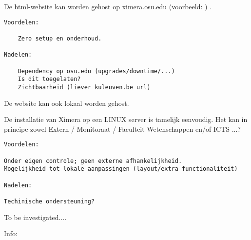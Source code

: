 \documentclass{ximera}
\begin{document}
De html-website kan worden gehost op ximera.osu.edu  (voorbeeld: ) . 

\begin{verbatim}
Voordelen:

    Zero setup en onderhoud.

Nadelen:

    Dependency op osu.edu (upgrades/downtime/...)
    Is dit toegelaten?
    Zichtbaarheid (liever kuleuven.be url)

\end{verbatim}

De website kan ook lokaal worden gehost.

De installatie van Ximera op een LINUX server is tamelijk eenvoudig. Het kan in principe zowel Extern / Monitoraat / Faculteit Wetenschappen en/of ICTS ...? 

\begin{verbatim}
Voordelen:

Onder eigen controle; geen externe afhankelijkheid.
Mogelijkheid tot lokale aanpassingen (layout/extra functionaliteit)

Nadelen:

Techinische ondersteuning?

\end{verbatim}

To be investigated....
    
Info: 
\end{document}

